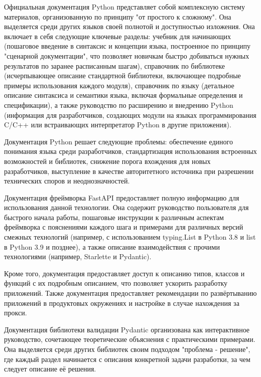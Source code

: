 \clearpage
{}

Официальная документация Python представляет собой комплексную систему материалов, организованную по принципу "от простого к сложному". Она выделяется среди других языков своей полнотой и доступностью изложения. Она включает в себя следующие ключевые разделы: учебник для начинающих (пошаговое введение в синтаксис и концепции языка, построенное по принципу "сценарной документации", что позволяет новичкам быстро добиваться нужных результатов по заранее расписанным шагам), справочник по библиотеке (исчерпывающее описание стандартной библиотеки, включающее подробные примеры использования каждого модуля), справочник по языку (детальное описание синтаксиса и семантики языка, включая формальные определения и спецификации), а также руководство по расширению и внедрению Python (информация для разработчиков, создающих модули на языках программирования C/C++ или встраивающих интерпретатор Python в другие приложения).

Документация Python решает следующие проблемы: обеспечение единого понимания языка среди разработчиков, стандартизация использования встроенных возможностей и библиотек, снижение порога вхождения для новых разработчиков, выступление в качестве авторитетного источника при разрешении технических споров и неоднозначностей.


Документация фреймворка FastAPI предоставляет полную информацию для использования данной технологии. Она содержит руководство пользователя для быстрого начала работы, пошаговые инструкции к различным аспектам фреймворка с пояснениями каждого шага и примерами для различных версий смежных технологий (например, с использованием typing.List в Python 3.8 и list в Python 3.9 и позднее), а также описание взаимодействия с прочими технологиями (например, Starlette и Pydantic).

Кроме того, документация предоставляет доступ к описанию типов, классов и функций с их подробным описанием, что позволяет ускорить разработку приложений. Также документация предоставляет рекомендации по развёртыванию приложений в продуктовых окружениях и настройке в случае нахождения за прокси.


Документация библиотеки валидации Pydantic организована как интерактивное руководство, сочетающее теоретические объяснения с практическими примерами. Она выделяется среди других библиотек своим подходом "проблема - решение", где каждый раздел начинается с описания конкретной задачи разработки, за чем следует описание её решения.


